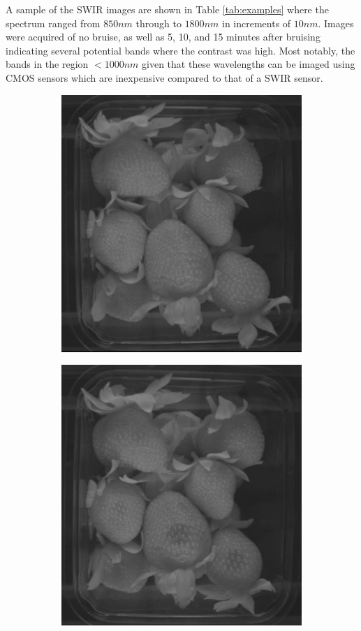 \documentclass[fleqn,twoside,12pt]{report}
\begin{document}
A sample of the SWIR images are shown in Table \ref{tab:examples} where the spectrum ranged from $850nm$ through to $1800nm$ in increments of $10nm$. Images were acquired of no bruise, as well as 5, 10, and 15 minutes after bruising indicating several potential bands where the contrast was high. Most notably, the bands in the region $<1000nm$ given that these wavelengths can be imaged using CMOS sensors which are inexpensive compared to that of a SWIR sensor.


\begin{figure}[h]
	\centering
	\begin{subfigure}{.5\textwidth}
		\centering
		\includegraphics[width=.8\linewidth]{bruise_ir_1.jpg}
		\caption{}
		\label{fig:bruise_ir_1}
	\end{subfigure}%
	\begin{subfigure}{.5\textwidth}
		\centering
		\includegraphics[width=.8\linewidth]{bruise_ir_2.jpg}
		\caption{}
		\label{fig:bruise_ir_2}
	\end{subfigure}%
	

\end{figure}
\end{document}
